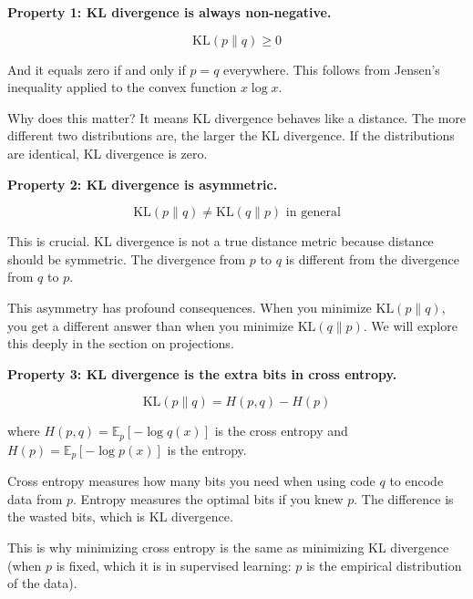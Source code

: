 \textbf{Property 1: KL divergence is always non-negative.}

\begin{equation}
\text{KL}(p \| q) \geq 0
\end{equation}

And it equals zero if and only if $p = q$ everywhere. This follows from Jensen's inequality applied to the convex function $x \log x$.

Why does this matter? It means KL divergence behaves like a distance. The more different two distributions are, the larger the KL divergence. If the distributions are identical, KL divergence is zero.

\vspace{1em}

\textbf{Property 2: KL divergence is asymmetric.}

\begin{equation}
\text{KL}(p \| q) \neq \text{KL}(q \| p) \text{ in general}
\end{equation}

This is crucial. KL divergence is not a true distance metric because distance should be symmetric. The divergence from $p$ to $q$ is different from the divergence from $q$ to $p$.

This asymmetry has profound consequences. When you minimize $\text{KL}(p \| q)$, you get a different answer than when you minimize $\text{KL}(q \| p)$. We will explore this deeply in the section on projections.

\vspace{1em}

\textbf{Property 3: KL divergence is the extra bits in cross entropy.}

\begin{equation}
\text{KL}(p \| q) = H(p, q) - H(p)
\end{equation}

where $H(p, q) = \mathbb{E}_{p}[-\log q(x)]$ is the cross entropy and $H(p) = \mathbb{E}_{p}[-\log p(x)]$ is the entropy.

Cross entropy measures how many bits you need when using code $q$ to encode data from $p$. Entropy measures the optimal bits if you knew $p$. The difference is the wasted bits, which is KL divergence.

\vspace{1em}

This is why minimizing cross entropy is the same as minimizing KL divergence (when $p$ is fixed, which it is in supervised learning: $p$ is the empirical distribution of the data).


